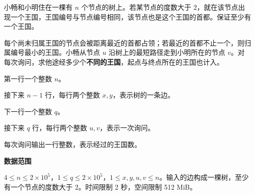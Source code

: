 \Legend
小畅和小明住在一棵有 $n$ 个节点的树上。若某节点的度数大于 $2$，就在该节点出现一个王国，王国编号与节点编号相同，该节点也是这个王国的首都。保证至少有一个王国。

每个尚未归属王国的节点会被距离最近的首都占领；若最近的首都不止一个，则归属编号最小的王国。小畅从节点 $u$ 沿树上的最短路径走到小明所在的节点 $v$。对每次询问，求他途经多少个\textbf{不同的王国}，起点与终点所在的王国也计入。

\Input

第一行一个整数 $n$。

接下来 $n-1$ 行，每行两个整数 $x,y$，表示树的一条边。

下一行一个整数 $q$。

接下来 $q$ 行，每行两个整数 $u,v$，表示一次询问。

\Output

每次询问输出一行整数，表示经过的王国数。

\textbf{数据范围}

$4\le n\le 2\times10^5$，$1\le q\le 2\times10^5$，$1\le x,y,u,v\le n$。输入的边构成一棵树，至少有一个节点的度数大于 $2$。时间限制 2 秒，空间限制 512 MiB。

\Examples

\begin{example}
\end{example}
